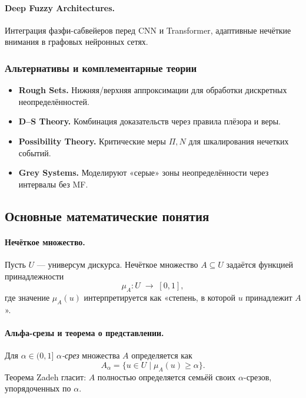\paragraph{Deep Fuzzy Architectures.}  
Интеграция фазфи-сабвейеров перед CNN и Transformer, адаптивные нечёткие внимания в графовых нейронных сетях.

\subsubsection{Альтернативы и комплементарные теории}
\label{subsubsec:complementary}

\begin{itemize}
  \item \textbf{Rough Sets.} Нижняя/верхняя аппроксимации для обработки дискретных неопределённостей.
  \item \textbf{D–S Theory.} Комбинация доказательств через правила плёзора и веры.
  \item \textbf{Possibility Theory.} Критические меры $\Pi,N$ для шкалирования нечетких событий.
  \item \textbf{Grey Systems.} Моделируют «серые» зоны неопределённости через интервалы без MF.
\end{itemize}


\subsection{Основные математические понятия}
\label{subsec:math_basics}

\paragraph{Нечёткое множество.}
Пусть $U$ — универсум дискурса. Нечёткое множество
$A\subseteq U$ задаётся функцией принадлежности
\begin{equation}
  \mu_A : U \;\to\; [0,1],
  \label{eq:mf_def}
\end{equation}
где значение $\mu_A(u)$ интерпретируется как «степень, в которой
$u$ принадлежит $A$».

\paragraph{Альфа-срезы и теорема о представлении.}
Для $\alpha\in(0,1]$ \emph{$\alpha$-срез} множества $A$
определяется как
\begin{equation}
  A_\alpha = \bigl\{u\in U \mid \mu_A(u)\ge\alpha\bigr\}.
  \label{eq:alpha_cut}
\end{equation}
Теорема Zadeh гласит: $A$ полностью определяется семьёй
своих $\alpha$-срезов, упорядоченных по $\alpha$.

